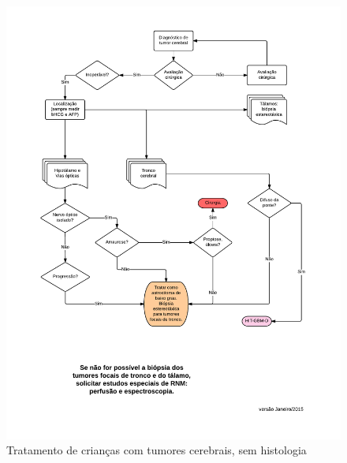 \documentclass[11pt,a4paper,oldfontcommands]{memoir}
\begin{document}
\begin{center}
\begin{figure}[!htb]
\includegraphics[scale=0.86,trim = 20mm 50mm 10mm 13mm,clip]{fig/fig2.pdf}
\caption{Tratamento de crianças com tumores cerebrais, sem histologia}
\end{figure}
\end{center}
\end{document}
